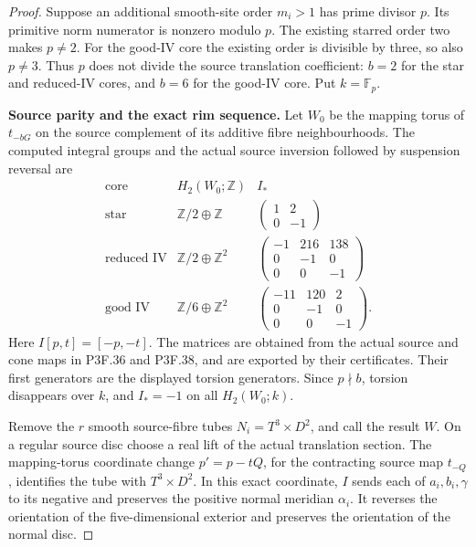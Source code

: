 \begin{proof}
Suppose an additional smooth-site order \(m_i>1\) has prime
divisor \(p\). Its primitive norm numerator is nonzero modulo
\(p\). The existing starred order two makes \(p\ne2\).
For the good-IV core the existing order is divisible by three,
so also \(p\ne3\). Thus \(p\) does not divide the source
translation coefficient: \(b=2\) for the star and reduced-IV
cores, and \(b=6\) for the good-IV core. Put \(k=\mathbb F_p\).

\par\medskip\noindent\textbf{Source parity and the exact rim sequence.}
Let \(W_0\) be the mapping torus of \(t_{-bG}\) on the source
complement of its additive fibre neighbourhoods. The computed
integral groups and the actual source inversion followed by
suspension reversal are
\[
\begin{array}{c|c|c}
\text{core}&H_2(W_0;\mathbb Z)&I_*\\\hline
\text{star}&\mathbb Z/2\oplus\mathbb Z&
 \left(\begin{smallmatrix}1&2\\0&-1\end{smallmatrix}\right)\\
\text{reduced IV}&\mathbb Z/2\oplus\mathbb Z^2&
 \left(\begin{smallmatrix}-1&216&138\\0&-1&0\\0&0&-1\end{smallmatrix}\right)\\
\text{good IV}&\mathbb Z/6\oplus\mathbb Z^2&
 \left(\begin{smallmatrix}-11&120&2\\0&-1&0\\0&0&-1\end{smallmatrix}\right).
\end{array}                                                   \tag{P3F.39.2}
\]
Here \(I[p,t]=[-p,-t]\). The matrices are obtained from the
actual source and cone maps in P3F.36 and P3F.38, and are exported
by their certificates. Their first generators are the displayed
torsion generators. Since \(p\nmid b\), torsion disappears
over \(k\), and \(I_*=-1\) on all \(H_2(W_0;k)\).

Remove the \(r\) smooth source-fibre tubes
\(N_i=T^3\times D^2\), and call the result \(W\). On a
regular source disc choose a real lift of the actual translation
section. The mapping-torus coordinate change
\(p'=p-tQ\), for the contracting source map \(t_{-Q}\),
identifies the tube with \(T^3\times D^2\). In this exact
coordinate, \(I\) sends each of \(a_i,b_i,\gamma\) to its
negative and preserves the positive normal meridian \(\alpha_i\).
It reverses the orientation of the five-dimensional exterior and
preserves the orientation of the normal disc.


\end{proof}
